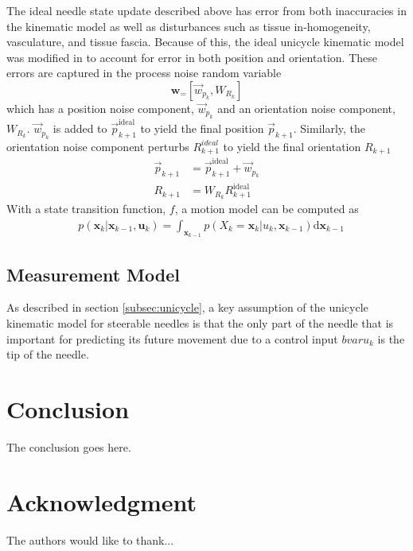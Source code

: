 \documentclass[journal,transmag]{IEEEtran}
\newcommand{\bvar}[2]{\mathbf{#1}_{#2}}
\begin{document}
The ideal needle state update described above has error from both inaccuracies in the kinematic model as well as disturbances such as tissue in-homogeneity, vasculature, and tissue fascia.  Because of this, the ideal unicycle kinematic model was modified in \cite{adebar2014recursive} to account for error in both position and orientation.  These errors are captured in the process noise random variable 
\begin{equation*}
\bvar{w} = \left[\vec{w}_{p_k}, W_{R_k}\right]
\end{equation*}  
which has a position noise component, $\vec{w}_{p_k}$ and an orientation noise component, $W_{R_k}$.  $\vec{w}_{p_k}$ is added to $\vec{p}^{\text{ideal}}_{k+1}$ to yield the final position $\vec{p}_{k+1}$.
Similarly, the orientation noise component perturbs $R^{ideal}_{k+1}$ to yield the final orientation $R_{k+1}$
\begin{align*}
\vec{p}_{k+1} &= \vec{p}^{\text{ideal}}_{k+1}+\vec{w}_{p_k} \\
R_{k+1} &= W_{R_k}R^{\text{ideal}}_{k+1}
\end{align*}
With a state transition function, $f$, a motion model can be computed as 
\begin{align*}
& p(\bvar{x}{k}|\bvar{x}{k-1},\bvar{u}{k}) = \int_{\bvar{x}{k-1}} p(X_k = \bvar{x}{k} | u_k, \bvar{x}{k-1}) \mathrm{d}\bvar{x}{k-1}
\end{align*}

\subsection{Measurement Model} \label{subsec:measurement}
As described in section \ref{subsec:unicycle}, a key assumption of the unicycle kinematic model for steerable needles is that the only part of the needle that is important for predicting its future movement due to a control input $bvar{u}_k$ is the tip of the needle.  
 
\section{Conclusion}
The conclusion goes here.


\section*{Acknowledgment}
The authors would like to thank...


\end{document}

